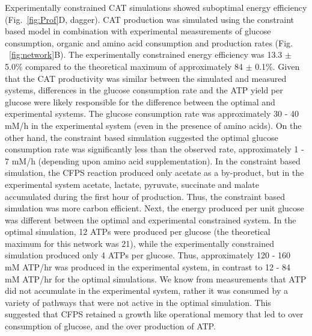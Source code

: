 \documentclass[journal=asbcd6,manuscript=article]{achemso}
\begin{document}
Experimentally constrained CAT simulations showed suboptimal energy efficiency (Fig.~\ref{fig:Prof}D, dagger).
CAT production was simulated using the constraint based model in combination with experimental measurements of glucose consumption, organic and amino acid consumption and production rates (Fig. ~\ref{fig:network}B).
The experimentally constrained energy efficiency was 13.3 $\pm$ 5.0\% compared to the theoretical maximum of approximately 84 $\pm$ 0.1\%.
Given that the CAT productivity was similar between the simulated and measured systems, differences in
the glucose consumption rate and the ATP yield per glucose were likely responsible for the difference between the optimal and experimental systems.
The glucose consumption rate was approximately 30 - 40 mM/h in the experimental system (even in the presence of amino acids).
On the other hand, the constraint based simulation suggested the optimal glucose consumption rate was significantly less than the observed rate, approximately 1 - 7 mM/h (depending upon amino acid supplementation).
In the constraint based simulation, the CFPS reaction produced only acetate as a by-product, but in the experimental system acetate, lactate, pyruvate, succinate and malate accumulated during the first hour of production. Thus, the constraint based simulation was more carbon efficient.
Next, the energy produced per unit glucose was different between the optimal and experimental constrained system.
In the optimal simulation, 12 ATPs were produced per glucose (the theoretical maximum for this network was 21),
while the experimentally constrained simulation produced only 4 ATPs per glucose.
Thus, approximately 120 - 160 mM ATP/hr was produced in the experimental system, in contrast to 12 - 84 mM ATP/hr for the optimal simulations.
We know from measurements that ATP did not accumulate in the experimental system, rather it was consumed by a variety of pathways that were not active
in the optimal simulation. This suggested that CFPS retained a growth like operational memory that led to over consumption of glucose, and the over production of ATP.
\end{document}
